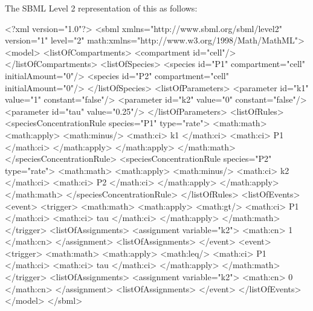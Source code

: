 \documentclass[10pt]{cekarticle}
\begin{document}
The SBML Level 2 representation of this as follows:

\begin{example}
<?xml version="1.0"?>
<sbml xmlns="http://www.sbml.org/sbml/level2" version="1" level="2"
      math:xmlns="http://www.w3.org/1998/Math/MathML">
    <model>
        <listOfCompartments>
            <compartment id="cell"/>
        </listOfCompartments>
        <listOfSpecies>
            <species id="P1" compartment="cell" initialAmount="0"/>
            <species id="P2" compartment="cell" initialAmount="0"/>
        </listOfSpecies>
        <listOfParameters>
            <parameter id="k1" value="1" constant="false"/>
            <parameter id="k2" value="0" constant="false"/>
            <parameter id="tau" value="0.25"/>
        </listOfParameters>
        <listOfRules>
            <speciesConcentrationRule species="P1" type="rate">
                <math:math>
                    <math:apply>
                        <math:minus/>
                        <math:ci> k1 </math:ci>
                        <math:ci> P1 </math:ci>
                        </math:apply>
                    </math:apply>
                </math:math>
            </speciesConcentrationRule>
            <speciesConcentrationRule species="P2" type="rate">
                <math:math>
                    <math:apply>
                        <math:minus/>
                        <math:ci> k2 </math:ci>
                        <math:ci> P2 </math:ci>
                        </math:apply>
                    </math:apply>
                </math:math>
            </speciesConcentrationRule>
        </listOfRules>
        <listOfEvents>
            <event>
                <trigger>
                    <math:math>
                        <math:apply>
                            <math:gt/>
                            <math:ci> P1 </math:ci>
                            <math:ci> tau </math:ci>
                        </math:apply>
                    </math:math>
                </trigger>
                <listOfAssignments>
                    <assignment variable="k2">
                        <math:cn> 1 </math:cn>
                    </assignment>
                <listOfAssignments>
            </event>
            <event>
                <trigger>
                    <math:math>
                        <math:apply>
                            <math:leq/>
                            <math:ci> P1 </math:ci>
                            <math:ci> tau </math:ci>
                        </math:apply>
                    </math:math>
                </trigger>
                <listOfAssignments>
                    <assignment variable="k2">
                        <math:cn> 0 </math:cn>
                    </assignment>
                <listOfAssignments>
            </event>
        </listOfEvents>
    </model>
</sbml>
\end{example}
\end{document}

